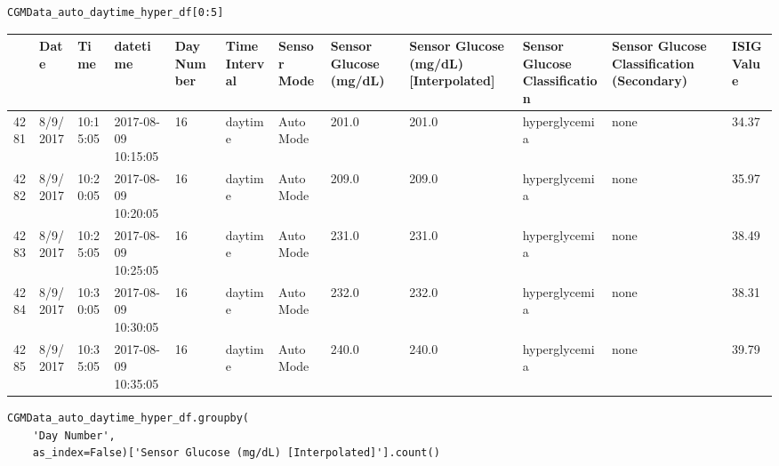 \bigskip

\begin{verbatim}
CGMData_auto_daytime_hyper_df[0:5]
\end{verbatim}

\bigskip\noindent
\begin{tabular}{p{}p{}p{}p{}p{}p{}p{}p{}p{}p{}p{}p{}}
\toprule
 & Date & Time & datetime & Day Number & Time Interval & Sensor Mode & Sensor Glucose (mg/dL) & Sensor Glucose (mg/dL) [Interpolated] & Sensor Glucose Classification & Sensor Glucose Classification (Secondary) & ISIG Value \\
\hline
4281 & 8/9/2017 & 10:15:05 & 2017-08-09 10:15:05 & 16 & daytime & Auto Mode & 201.0 & 201.0 & hyperglycemia & none & 34.37 \\
\hline
4282 & 8/9/2017 & 10:20:05 & 2017-08-09 10:20:05 & 16 & daytime & Auto Mode & 209.0 & 209.0 & hyperglycemia & none & 35.97 \\
\hline
4283 & 8/9/2017 & 10:25:05 & 2017-08-09 10:25:05 & 16 & daytime & Auto Mode & 231.0 & 231.0 & hyperglycemia & none & 38.49 \\
\hline
4284 & 8/9/2017 & 10:30:05 & 2017-08-09 10:30:05 & 16 & daytime & Auto Mode & 232.0 & 232.0 & hyperglycemia & none & 38.31 \\
\hline
4285 & 8/9/2017 & 10:35:05 & 2017-08-09 10:35:05 & 16 & daytime & Auto Mode & 240.0 & 240.0 & hyperglycemia & none & 39.79 \\
\hline
\bottomrule
\end{tabular}

\bigskip

\begin{verbatim}
CGMData_auto_daytime_hyper_df.groupby(
    'Day Number', 
    as_index=False)['Sensor Glucose (mg/dL) [Interpolated]'].count()
\end{verbatim}

